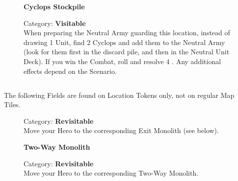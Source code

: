 \begin{figure}[H]
  \begin{minipage}[t]{0.47\textwidth}
    \vspace{0pt}
    \centering
    \textbf{Cyclops Stockpile}\par
    \caption{\small Category: \textbf{Visitable}\\
      When preparing the Neutral Army guarding this location, instead of drawing 1  Unit, find 2  Cyclops and add them to the Neutral Army (look for them first in the  discard pile, and then in the  Neutral Unit Deck).
      If you win the Combat, roll and resolve 4 .
      Any additional effects depend on the Scenario.
    }
  \end{minipage}\hfill
\end{figure}


\newpage

\subsection*{}

The following Fields are found on Location Tokens only, not on regular Map Tiles.

\begin{figure}[H]
  \begin{minipage}[t]{0.47\textwidth}
    \vspace{0pt}
    \centering
    \phantom{j}\phantom{j}\par
    \caption{\small Category: \textbf{Revisitable}\\
      Move your Hero to the corresponding Exit Monolith (see below).
    }
  \end{minipage}\hfill
  \begin{minipage}[t]{0.47\textwidth}
    \vspace{0pt}
    \centering
    \textbf{Two-Way Monolith}\par
    \caption{\small Category: \textbf{Revisitable}\\
      Move your Hero to the corresponding Two-Way Monolith.
    }
  \end{minipage}
\end{figure}

